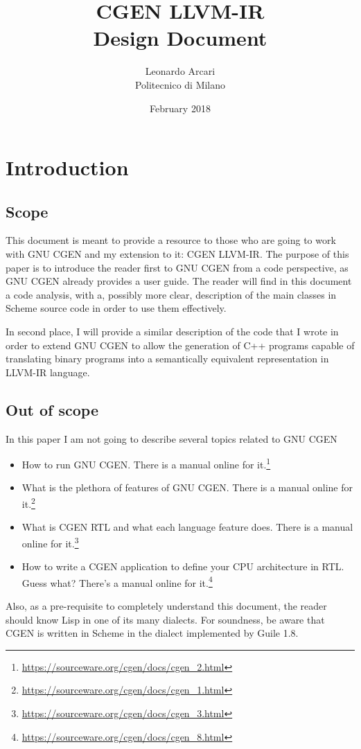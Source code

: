 \documentclass{article}
\begin{document}
\title{CGEN LLVM-IR \\ Design Document \vfill}
\author{Leonardo Arcari \\ Politecnico di Milano}
\date{February 2018}
\maketitle
\thispagestyle{empty}
\clearpage

\tableofcontents
\clearpage

\section{Introduction}
\subsection{Scope}
This document is meant to provide a resource to those who are going to work with GNU CGEN and my extension to it: CGEN LLVM-IR. The purpose of this paper is to introduce the reader first to GNU CGEN from a code perspective, as GNU CGEN already provides a user guide. The reader will find in this document a code analysis, with a, possibly more clear, description of the main classes in Scheme source code in order to use them effectively.

In second place, I will provide a similar description of the code that I wrote in order to extend GNU CGEN to allow the generation of C++ programs capable of translating binary programs into a semantically equivalent representation in LLVM-IR language.

\subsection{Out of scope}
In this paper I am not going to describe several topics related to GNU CGEN
\begin{itemize}
\item How to run GNU CGEN. There is a manual online for it.\footnote{\url{https://sourceware.org/cgen/docs/cgen_2.html}}
\item What is the plethora of features of GNU CGEN. There is a manual online for it.\footnote{\url{https://sourceware.org/cgen/docs/cgen_1.html}}
\item What is CGEN RTL and what each language feature does. There is a manual online for it.\footnote{\url{https://sourceware.org/cgen/docs/cgen_3.html}}
\item How to write a CGEN application to define your CPU architecture in RTL. Guess what? There's a manual online for it.\footnote{\url{https://sourceware.org/cgen/docs/cgen_8.html}}
\end{itemize}
Also, as a pre-requisite to completely understand this document, the reader should know Lisp in one of its many dialects. For soundness, be aware that CGEN is written in Scheme in the dialect implemented by Guile 1.8.
\end{document}
